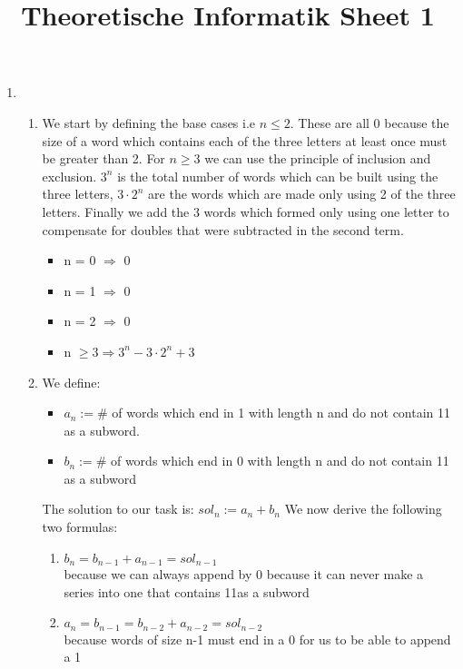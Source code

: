\documentclass[8pt]{extreport}
\title{Theoretische Informatik Sheet 1}
\begin{document}
\begin{enumerate}
\item
\begin{enumerate}[label = \alph*)]
\item We start by defining the base cases i.e $n\leq 2$. These are all 0 because the size of a word which contains each of the three letters at least once must be greater than 2. For $n \geq 3$ we can use the principle of inclusion and exclusion. $3^n$ is the total number of words which can be built using the three letters, $3\cdot2^n$ are the words which are made only using 2 of the three letters. Finally we add the 3 words which formed only using one letter to compensate for doubles that were subtracted in the second term.
\begin{itemize}
\item n = 0 $\Rightarrow$ 0
\item n = 1 $\Rightarrow$ 0
\item n = 2 $\Rightarrow$ 0
\item n $\geq 3 \Rightarrow 3^n-3\cdot 2^n + 3$ 
\end{itemize}
\item We define:
\begin{itemize}
\item $a_n:= \#$ of words which end in 1 with length n and do not contain 11 as a subword.
\item $b_n:= \#$ of words which end in 0 with length n and do not contain 11 as a subword
\end{itemize}
The solution to our task is: $sol_n:= a_n + b_n$
We now derive the following two formulas:
\begin{enumerate}
\item $b_n = b_{n-1} + a_{n-1} = sol_{n-1}$\\ because we can always append by 0 because it can never make a series into one that contains 11as a subword
\item $a_n =b_{n-1} = b_{n-2}+a_{n-2} = sol_{n-2}$\\  because words of size n-1 must end in a 0 for us to be able to append a 1


\end{enumerate}
\end{enumerate}
\end{enumerate}
\end{document}
